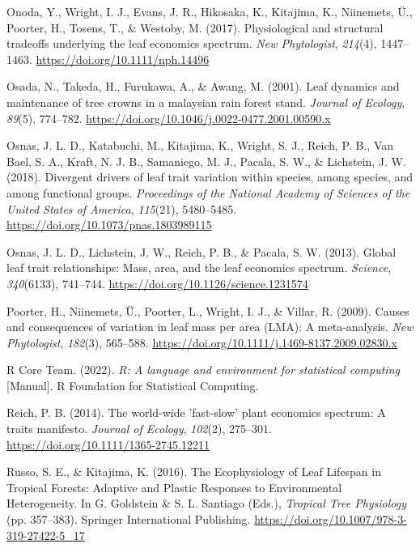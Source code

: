 \documentclass[
  12pt,
  letterpaper,
  DIV=11,
  numbers=noendperiod]{scrartcl}
\newlength{\cslhangindent}
\newlength{\cslentryspacingunit} %
\newenvironment{CSLReferences}[2] %
 {%
  \setlength{\parindent}{0pt}
  \ifodd #1
  \let\oldpar\par
  \def\par{\hangindent=\cslhangindent\oldpar}
  \fi
  \setlength{\parskip}{#2\cslentryspacingunit}
 }%
 {}
\begin{document}
\begin{CSLReferences}{1}{0}
\leavevmode{}%
Onoda, Y., Wright, I. J., Evans, J. R., Hikosaka, K., Kitajima, K.,
Niinemets, Ü., Poorter, H., Tosens, T., \& Westoby, M. (2017).
Physiological and structural tradeoffs underlying the leaf economics
spectrum. \emph{New Phytologist}, \emph{214}(4), 1447--1463.
\url{https://doi.org/10.1111/nph.14496}

\leavevmode{}%
Osada, N., Takeda, H., Furukawa, A., \& Awang, M. (2001). Leaf dynamics
and maintenance of tree crowns in a malaysian rain forest stand.
\emph{Journal of Ecology}, \emph{89}(5), 774--782.
\url{https://doi.org/10.1046/j.0022-0477.2001.00590.x}

\leavevmode{}%
Osnas, J. L. D., Katabuchi, M., Kitajima, K., Wright, S. J., Reich, P.
B., Van Bael, S. A., Kraft, N. J. B., Samaniego, M. J., Pacala, S. W.,
\& Lichstein, J. W. (2018). Divergent drivers of leaf trait variation
within species, among species, and among functional groups.
\emph{Proceedings of the National Academy of Sciences of the United
States of America}, \emph{115}(21), 5480--5485.
\url{https://doi.org/10.1073/pnas.1803989115}

\leavevmode{}%
Osnas, J. L. D., Lichstein, J. W., Reich, P. B., \& Pacala, S. W.
(2013). Global leaf trait relationships: {Mass}, area, and the leaf
economics spectrum. \emph{Science}, \emph{340}(6133), 741--744.
\url{https://doi.org/10.1126/science.1231574}

\leavevmode{}%
Poorter, H., Niinemets, Ü., Poorter, L., Wright, I. J., \& Villar, R.
(2009). Causes and consequences of variation in leaf mass per area
({LMA}): {A} meta-analysis. \emph{New Phytologist}, \emph{182}(3),
565--588. \url{https://doi.org/10.1111/j.1469-8137.2009.02830.x}

\leavevmode{}%
R Core Team. (2022). \emph{R: {A} language and environment for
statistical computing} {[}Manual{]}. {R Foundation for Statistical
Computing}.

\leavevmode{}%
Reich, P. B. (2014). The world-wide 'fast-slow' plant economics
spectrum: {A} traits manifesto. \emph{Journal of Ecology},
\emph{102}(2), 275--301. \url{https://doi.org/10.1111/1365-2745.12211}

\leavevmode{}%
Russo, S. E., \& Kitajima, K. (2016). The {Ecophysiology} of {Leaf
Lifespan} in {Tropical Forests}: {Adaptive} and {Plastic Responses} to
{Environmental Heterogeneity}. In G. Goldstein \& S. L. Santiago (Eds.),
\emph{Tropical {Tree Physiology}} (pp. 357--383). {Springer
International Publishing}.
\url{https://doi.org/10.1007/978-3-319-27422-5_17}


\end{CSLReferences}
\end{document}
